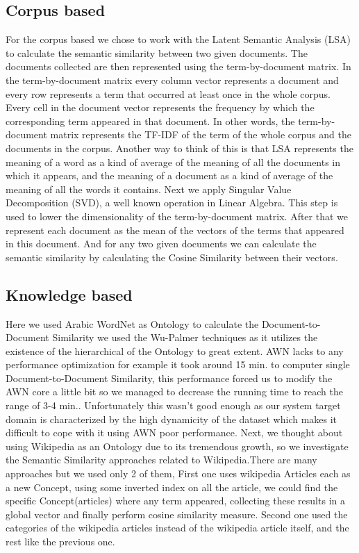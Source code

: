 \subsection{Corpus based}
For the corpus based we chose to work with the Latent Semantic Analysis (LSA) to calculate the semantic similarity between two given documents. The documents collected are then represented using the term-by-document matrix. In the term-by-document matrix every column vector represents a document and every row represents a term that occurred at least once in the whole corpus. Every cell in the document vector represents the frequency by which the corresponding term appeared in that document. In other words, the term-by-document matrix represents the TF-IDF of the term of the whole corpus and the documents in the corpus. Another way to think of this is that LSA represents the meaning of a word as a kind of average of the meaning of all the documents in which it appears, and the meaning of a document as a kind of average of the meaning of all the words it contains.
Next we apply Singular Value Decomposition (SVD), a well known operation in Linear Algebra. This step is used to lower the dimensionality of the term-by-document matrix.
After that we represent each document as the mean of the vectors of the terms that appeared in this document. And for any two given documents we can calculate the semantic similarity by calculating the Cosine Similarity between their vectors.

\subsection{Knowledge based}
Here we used Arabic WordNet as Ontology to calculate the Document-to-Document Similarity we used the Wu-Palmer techniques as it utilizes the existence of the hierarchical of the Ontology to great extent.
AWN lacks to any performance optimization for example it took around 15 min. to computer single Document-to-Document Similarity, this performance forced us to modify the AWN core a little bit so we managed to decrease the running time to reach the range of 3-4 min.. Unfortunately this wasn’t good enough as our system target domain is characterized by the high dynamicity of the dataset which makes it difficult to cope with it using AWN poor performance.
Next, we thought about using Wikipedia as an Ontology due to its tremendous growth, so we investigate the Semantic Similarity approaches related to Wikipedia.There are many approaches but we used only 2 of them, First one uses wikipedia Articles each as a new Concept, using some inverted index on all the article, we could find the specific Concept(articles) where any term appeared, collecting these results in a global vector and finally perform cosine similarity measure.
Second one used the categories of the wikipedia articles instead of the wikipedia article itself, and the rest like the previous one.

